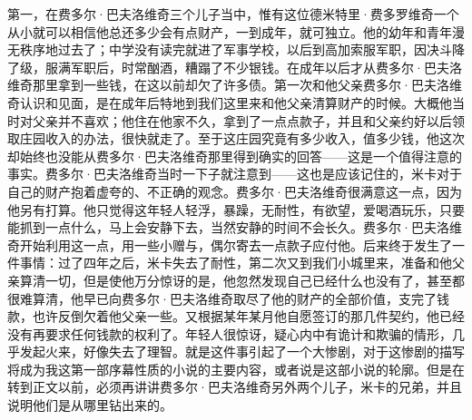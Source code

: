 \par 第一，在费多尔·巴夫洛维奇三个儿子当中，惟有这位德米特里·费多罗维奇一个从小就可以相信他总还多少会有点财产，一到成年，就可独立。他的幼年和青年漫无秩序地过去了；中学没有读完就进了军事学校，以后到高加索服军职，因决斗降了级，服满军职后，时常酗酒，糟蹋了不少银钱。在成年以后才从费多尔·巴夫洛维奇那里拿到一些钱，在这以前却欠了许多债。第一次和他父亲费多尔·巴夫洛维奇认识和见面，是在成年后特地到我们这里来和他父亲清算财产的时候。大概他当时对父亲并不喜欢；他住在他家不久，拿到了一点点款子，并且和父亲约好以后领取庄园收入的办法，很快就走了。至于这庄园究竟有多少收入，值多少钱，他这次却始终也没能从费多尔·巴夫洛维奇那里得到确实的回答——这是一个值得注意的事实。费多尔·巴夫洛维奇当时一下子就注意到——这也是应该记住的，米卡对于自己的财产抱着虚夸的、不正确的观念。费多尔·巴夫洛维奇很满意这一点，因为他另有打算。他只觉得这年轻人轻浮，暴躁，无耐性，有欲望，爱喝酒玩乐，只要能抓到一点什么，马上会安静下去，当然安静的时间不会长久。费多尔·巴夫洛维奇开始利用这一点，用一些小赠与，偶尔寄去一点款子应付他。后来终于发生了一件事情：过了四年之后，米卡失去了耐性，第二次又到我们小城里来，准备和他父亲算清一切，但是使他万分惊讶的是，他忽然发现自己已经什么也没有了，甚至都很难算清，他早已向费多尔·巴夫洛维奇取尽了他的财产的全部价值，支完了钱款，也许反倒欠着他父亲一些。又根据某年某月他自愿签订的那几件契约，他已经没有再要求任何钱款的权利了。年轻人很惊讶，疑心内中有诡计和欺骗的情形，几乎发起火来，好像失去了理智。就是这件事引起了一个大惨剧，对于这惨剧的描写将成为我这第一部序幕性质的小说的主要内容，或者说是这部小说的轮廓。但是在转到正文以前，必须再讲讲费多尔·巴夫洛维奇另外两个儿子，米卡的兄弟，并且说明他们是从哪里钻出来的。
